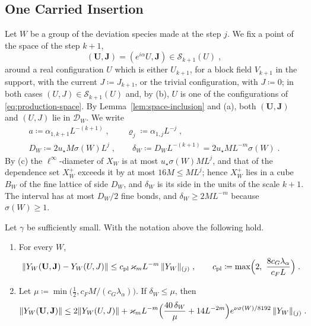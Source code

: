 \subsection{One Carried Insertion}\label{sec:one-carried-insertion}

Let $W$ be a group of the deviation species made at the step $j$. We fix a point of the space of the step $k + 1$,
\begin{equation}\label{eq:carried-datum}
    (\mathbf U, \mathbf J) = (e^{i\alpha}U, \mathbf J) \in \mathcal S_{k+1}(U)\;,
\end{equation}
around a real configuration $U$ which is either $U_{k+1}$, for a block field $V_{k+1}$ in the support, with the current $J \coloneqq J_{k+1}$, or the trivial configuration, with $J \coloneqq 0$; in both cases $(U, J) \in \mathcal S_{k+1}(U)$ and, by (b), $U$ is one of the configurations of \eqref{eq:production-space}. By Lemma~\ref{lem:space-inclusion} and (a), both $(\mathbf U, \mathbf J)$ and $(U, J)$ lie in $\mathcal D_W$. We write
\begin{equation}\label{eq:carried-sizes}
\begin{gathered}
    a \coloneqq \alpha_{1,k+1}L^{-(k+1)}\;,
    \qquad
    \varrho_j \coloneqq \alpha_{1,j}L^{-j}\;,\\
    D_W \coloneqq 2u_\star M\sigma(W)L^j\;,
    \qquad
    \delta_W \coloneqq D_WL^{-(k+1)} = 2u_\star ML^{-m}\sigma(W)\;.
\end{gathered}
\end{equation}
By (c) the $\ell^\infty$-diameter of $X_W$ is at most $u_\star\sigma(W)ML^j$, and that of the dependence set $X^+_W$ exceeds it by at most $16M \leq ML^j$; hence $X^+_W$ lies in a cube $B_W$ of the fine lattice of side $D_W$, and $\delta_W$ is its side in the units of the scale $k + 1$. The interval has at most $D_W/2$ fine bonds, and $\delta_W \geq 2ML^{-m}$ because $\sigma(W) \geq 1$.

\begin{proposition}\label{prop:one-carried}
Let $\gamma$ be sufficiently small. With the notation above the following hold.
\begin{enumerate}[label=(\roman*)]
\item For every $W$,
\begin{equation}\label{eq:excess-plain}
    \norm{Y_W(\mathbf U, \mathbf J) - Y_W(U, J)} \leq c_{\mathrm{pl}}\,\varkappa_mL^{-m}\,\norm{Y_W}_{(j)}\;,
    \qquad
    c_{\mathrm{pl}} \coloneqq \max\Bigl(2,\ \frac{8c_G\lambda_\alpha}{c_FL}\Bigr)\;.
\end{equation}
\item Let $\mu \coloneqq \min\bigl(\frac12, c_FM/(c_G\lambda_\alpha)\bigr)$. If $\delta_W \leq \mu$, then
\begin{equation}\label{eq:excess-covariant}
    \lVert Y_W(\mathbf U, \mathbf J)\rVert \leq 2\lVert Y_W(U, J)\rVert + \varkappa_mL^{-m}\Bigl(\frac{40\,\delta_W}{\mu} + 14L^{-2m}\Bigr)e^{\nu\sigma(W)/8192}\,\lVert Y_W\rVert_{(j)}\;.
\end{equation}
\end{enumerate}
\end{proposition}

